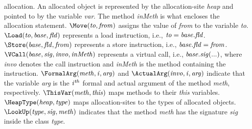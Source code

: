 {allocation. An allocated object is represented by the allocation-site
{\it heap} and pointed to by the variable {\it var}. The method {\it
  inMeth} is what encloses the allocation statement.
$\Move ({\it to}, {\it from})$ assigns the value of {\it from}
to the variable {\it to}.
$\Load ({\it to}, {\it base}, {\it fld})$ represents a load
instruction, i.e., ${\it to} = {\it base}.{\it fld}$.
$\Store ({\it base}, {\it fld}, {\it from})$ represents a
store instruction, i.e., ${\it base}.{\it fld} = {\it from}$.
$\VCall ({\it base}, {\it sig}, {\it invo}, {\it inMeth})$
represents a virtual call, i.e., ${\it base}.{\it sig}(...)$, where
{\it invo} denotes the call instruction and {\it inMeth} is the method
containing the instruction.
$\FormalArg ({\it meth}, {\it i}, {\it arg})$ and
$\ActualArg ({\it invo}, {\it i}, {\it arg})$ indicate
that the variable {\it arg} is the ${\it i}^{\it th}$ formal and
actual argument of the method {\it meth}, respectively.
$\ThisVar ({\it meth}, {\it this})$ maps methods to their {\it
  this} variables.  $\HeapType ({\it heap}, {\it type})$ maps
allocation-sites to the types of allocated objects.
$\LookUp ({\it type}, {\it sig}, {\it meth})$ indicates that
the method {\it meth} has the signature {\it sig} inside the class {\it type}.


}
